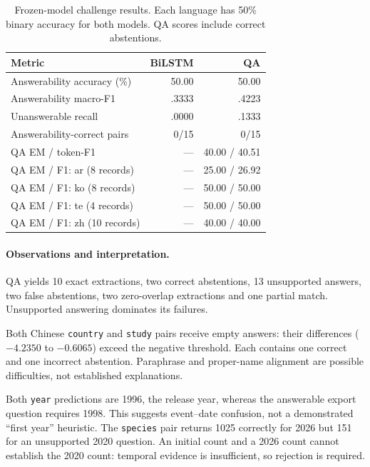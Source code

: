 \documentclass[11pt]{article}
\begin{document}
\begin{table}[ht]
\centering\small\setlength{\tabcolsep}{5pt}
\begin{tabular}{lrr}
\toprule
Metric & BiLSTM & QA\\
\midrule
Answerability accuracy (\%) & 50.00 & 50.00\\
Answerability macro-F1 & .3333 & .4223\\
Unanswerable recall & .0000 & .1333\\
Answerability-correct pairs & 0/15 & 0/15\\
QA EM / token-F1 & --- & 40.00 / 40.51\\
\midrule
QA EM / F1: ar (8 records) & --- & 25.00 / 26.92\\
QA EM / F1: ko (8 records) & --- & 50.00 / 50.00\\
QA EM / F1: te (4 records) & --- & 50.00 / 50.00\\
QA EM / F1: zh (10 records) & --- & 40.00 / 40.00\\
\bottomrule
\end{tabular}
\caption{Frozen-model challenge results. Each language has 50\% binary accuracy for both models. QA scores include correct abstentions.}
\label{tab:challenge}
\end{table}

\paragraph{Observations and interpretation.}
QA yields 10 exact extractions, two correct abstentions, 13 unsupported answers, two false abstentions, two zero-overlap extractions and one partial match. Unsupported answering dominates its failures.

Both Chinese \texttt{country} and \texttt{study} pairs receive empty answers: their differences ($-4.2350$ to $-0.6065$) exceed the negative threshold. Each contains one correct and one incorrect abstention. Paraphrase and proper-name alignment are possible difficulties, not established explanations.

Both \texttt{year} predictions are 1996, the release year, whereas the answerable export question requires 1998. This suggests event--date confusion, not a demonstrated ``first year'' heuristic. The \texttt{species} pair returns 1025 correctly for 2026 but 151 for an unsupported 2020 question. An initial count and a 2026 count cannot establish the 2020 count: temporal evidence is insufficient, so rejection is required.
\end{document}
